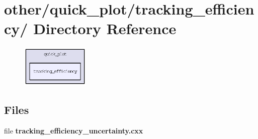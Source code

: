 \section{other/quick\_\-plot/tracking\_\-efficiency/ Directory Reference}
\label{dir_34773c2a005ef7f0b6587d0833408a19}


\begin{figure}[H]
\begin{center}
\leavevmode
\includegraphics[width=92pt]{dir_34773c2a005ef7f0b6587d0833408a19_dep}
\end{center}
\end{figure}
\subsection*{Files}
\begin{CompactItemize}
\item 
file \textbf{tracking\_\-efficiency\_\-uncertainty.cxx}
\end{CompactItemize}
